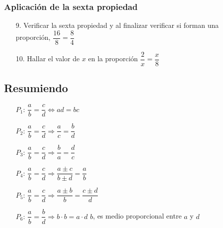\documentclass[10pt,twoside]{article}
\begin{document}
\subsubsection*{Aplicaci\'{o}n de la sexta propiedad}
\begin{enumerate}
\item[9.] Verificar la sexta propiedad y al finalizar verificar si forman una proporción, \quad $\dfrac{16}{8}=\dfrac{8}{4}$
\item[10.] Hallar el valor de $x$ en la proporción \qquad $\dfrac{2}{x}=\dfrac{x}{8}$
\end{enumerate}
\subsection*{Resumiendo}
\begin{itemize}
\item[$P_{1}$:] $\dfrac{a}{b}=\dfrac{c}{d}\Leftrightarrow ad=bc$
\item[$P_{2}$:] $\dfrac{a}{b}=\dfrac{c}{d}\Rightarrow \dfrac{a}{c}=\dfrac{b}{d}$
\item[$P_{3}$:] $\dfrac{a}{b}=\dfrac{c}{d}\Rightarrow \dfrac{b}{a}=\dfrac{d}{c}$
\item[$P_{4}$:] $\dfrac{a}{b}=\dfrac{c}{d}\Rightarrow \dfrac{a\pm c}{b\pm d}=\dfrac{a}{b}$
\item[$P_{5}$:] $\dfrac{a}{b}=\dfrac{c}{d}\Rightarrow \dfrac{a\pm b}{b}=\dfrac{c\pm d}{d}$
\item[$P_{6}$:] $\dfrac{a}{b}=\dfrac{b}{d}\Rightarrow b\cdot b =a\cdot d$ \qquad $b$, es medio proporcional entre $a$ y $d$
\end{itemize}
\end{document}
